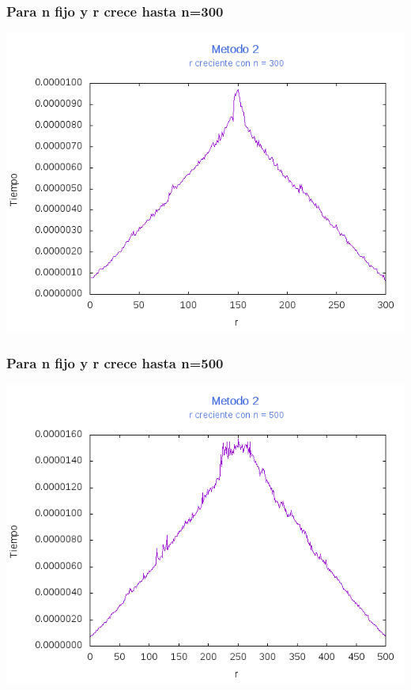\documentclass[12pt,letterpaper]{scrartcl}
\begin{document}
\subsubsection{Para n fijo y r crece hasta n=300}
\includegraphics[scale=1]{Metodo2/plot300m2}

\subsubsection{Para n fijo y r crece hasta n=500}
\includegraphics[scale=1]{Metodo2/plot500m2}
\end{document}
